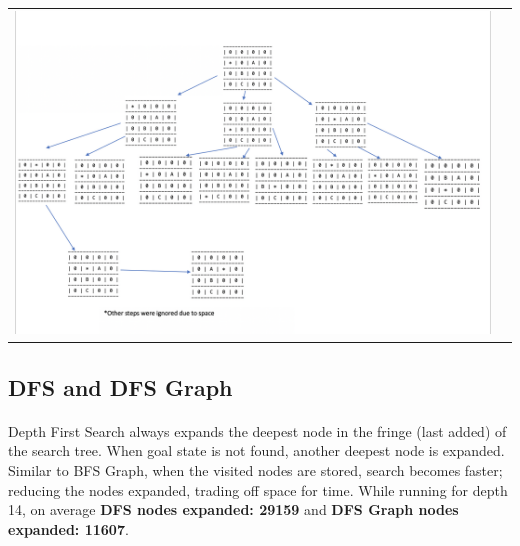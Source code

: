 \documentclass[10pt]{article}
\begin{document}
  \begin{center}
    \begin{tabular}{cc}
    \includegraphics[width=1\textwidth]{images/bfs.png} \\
      \end{tabular}
    \end{center}

  \subsection{DFS and DFS Graph}
  \paragraph{} \indent
  Depth First Search always expands the deepest node in the fringe (last added) of the search tree. When goal state is not found, another deepest node is expanded. 
  Similar to BFS Graph, when the visited nodes are stored, search becomes faster; reducing the nodes expanded, trading off space for time. 
  While running for depth 14, on average \textbf{DFS nodes expanded: 29159} and \textbf{DFS Graph nodes expanded: 11607}.
\end{document}
